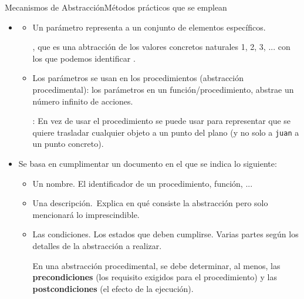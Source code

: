 \documentclass[10pt,envcountsect,spanish]{beamer}
\begin{document}
\begin{frame}[fragile]{Mecanismos de Abstracción}{Métodos prácticos que se emplean}

\begin{itemize}
\item {}

\begin{itemize}

\item 
Un parámetro representa a un conjunto de elementos específicos. 

\unEjemplo {}, que es una abtracción de los valores concretos naturales 1, 2, 3, ... con los que podemos identificar .

\item 
Los parámetros se usan en los procedimientos (abstracción procedimental): los parámetros en un función/procedimiento, abstrae un número infinito de acciones.

\unEjemplo: En vez de usar el procedimiento  se puede usar   para representar que se quiere trasladar cualquier objeto a un punto del plano (y no solo a \texttt{juan} a un punto concreto).  

\end{itemize}




\item {} Se basa en cumplimentar un documento en el que se indica lo siguiente:
\begin{itemize}
\item Un nombre. El identificador de un procedimiento, función, ...

\item Una descripción.~Explica en qué consiste la  abstracción pero  solo mencionará lo imprescindible. 

\item Las condiciones. Los estados que deben cumplirse. Varias partes según los detalles de la abstracción a realizar. 

\unEjemplo En una abstracción procedimental, se debe determinar, al menos,  las \textbf{precondiciones} (los requisito exigidos para el procedimiento) y las \textbf{postcondiciones} (el efecto de la ejecución).

\end{itemize}

\end{itemize}

\end{frame}
\end{document}
